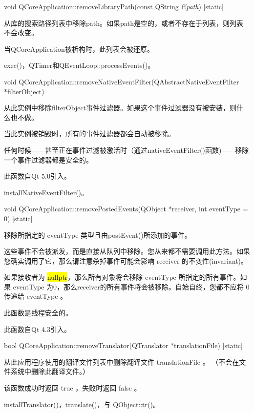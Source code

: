void QCoreApplication::removeLibraryPath(const QString \emph{\&path}) [static]

从库的搜索路径列表中移除path。如果path是空的，或者不存在于列表，则列表不会改变。

当QCoreApplication被析构时，此列表会被还原。


\begin{seeAlso}
exec()，QTimer和QEventLoop::processEvents()。
\end{seeAlso}


void QCoreApplication::removeNativeEventFilter(QAbstractNativeEventFilter *filterObject)

从此实例中移除filterObject事件过滤器。如果这个事件过滤器没有被安装，则什么也不做。

当此实例被销毁时，所有的事件过滤器都会自动被移除。

任何时候——甚至正在事件过滤被激活时（通过nativeEventFilter()函数)——移除一个事件过滤器都是安全的。

此函数自Qt 5.0引入。



\begin{seeAlso}
installNativeEventFilter()。
\end{seeAlso}


void QCoreApplication::removePostedEvents(QObject *receiver, int eventType = 0) [static]

移除所指定的 eventType 类型且由postEvent()所添加的事件。

这些事件不会被派发，而是直接从队列中移除。您从来都不需要调用此方法。如果您确实调用了它，那么请注意杀掉事件可能会影响 receiver 的不变性(invariant)。

如果接收者为 \hl{nullptr}，那么所有对象将会移除 eventType 所指定的所有事件。如果 eventType 为0，那么receiver的所有事件将会被移除。自始自终，您都不应将 0 传递给 eventType 。


\begin{notice}
此函数是线程安全的。
\end{notice}

此函数自Qt 4.3引入。

bool QCoreApplication::removeTranslator(QTranslator *translationFile) [static]

从此应用程序使用的翻译文件列表中删除翻译文件 translationFile 。 （不会在文件系统中删除此翻译文件。）

该函数成功时返回 true ，失败时返回 false 。


\begin{seeAlso}
installTranslator()，translate()，与 QObject::tr()。
\end{seeAlso}

